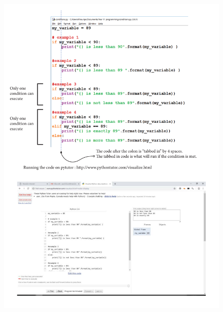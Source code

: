 \documentclass[a4paper,12pt]{article}
\begin{document}
 \begin{figure} [!h]
 	\centering
 	\includegraphics[width=17cm]{screen_shots/conditions.pdf}
 \end{figure}
\end{document}
